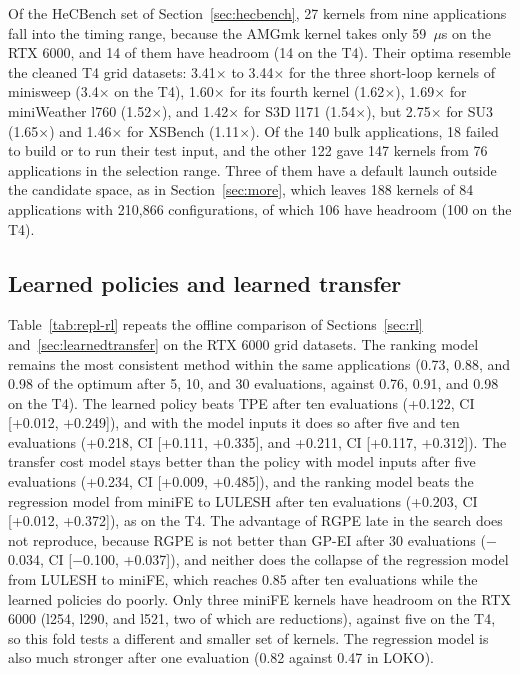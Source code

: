 \documentclass[10pt]{article}
\newcommand{\x}{\ensuremath{\times}}
\begin{document}
Of the HeCBench set of Section~\ref{sec:hecbench}, 27 kernels from nine
applications fall into the timing range, because the AMGmk kernel takes only
59~$\mu$s on the RTX 6000, and 14 of them have headroom (14 on the T4). Their
optima resemble the cleaned T4 grid datasets: 3.41\x{} to 3.44\x{} for the three
short-loop kernels of minisweep (3.4\x{} on the T4), 1.60\x{} for its fourth
kernel (1.62\x{}), 1.69\x{} for miniWeather l760 (1.52\x{}), and 1.42\x{} for S3D l171
(1.54\x{}), but 2.75\x{} for SU3 (1.65\x{}) and 1.46\x{} for XSBench (1.11\x{}). Of
the 140 bulk applications, 18 failed to build or to run their test input, and
the other 122 gave 147 kernels from 76 applications in the selection range.
Three of them have a default launch outside the candidate space, as in
Section~\ref{sec:more}, which leaves 188 kernels of 84 applications with
210{,}866 configurations, of which 106 have headroom (100 on the T4).

\subsection{Learned policies and learned transfer}
Table~\ref{tab:repl-rl} repeats the offline comparison of
Sections~\ref{sec:rl} and~\ref{sec:learnedtransfer} on the RTX 6000
grid datasets. The ranking model remains the most consistent method within the
same applications (0.73, 0.88, and 0.98 of the optimum after 5, 10, and 30
evaluations, against 0.76, 0.91, and 0.98 on the T4). The learned policy beats
TPE after ten evaluations (+0.122, CI [+0.012, +0.249]), and with the model
inputs it does so after five and ten evaluations (+0.218, CI [+0.111, +0.335],
and +0.211, CI [+0.117, +0.312]). The transfer cost model stays better than
the policy with model inputs after five evaluations (+0.234, CI [+0.009,
+0.485]), and the ranking model beats the regression model from miniFE to
LULESH after ten evaluations (+0.203, CI [+0.012, +0.372]), as on the T4.
The advantage of RGPE late in the search does not reproduce, because RGPE is
not better than GP-EI after 30 evaluations ($-$0.034, CI [$-$0.100, +0.037]), and neither does the collapse of the regression model from LULESH to
miniFE, which reaches 0.85 after ten evaluations while the learned policies do
poorly. Only three miniFE kernels have headroom on the RTX
6000 (l254, l290, and l521, two of which are reductions), against five on the
T4, so this fold tests a different and smaller set of kernels. The regression
model is also much stronger after one evaluation (0.82 against 0.47 in LOKO).
\end{document}
